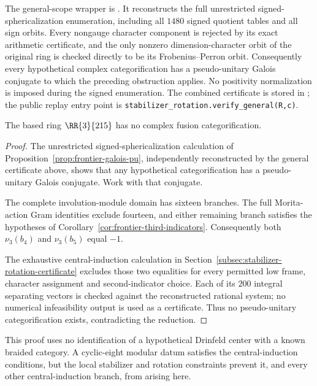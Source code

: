 The general-scope wrapper is
. It reconstructs the full
unrestricted signed-sphericalization enumeration, including all $1480$
signed quotient tables and all sign orbits.  Every nongauge character
component is rejected by its exact arithmetic certificate, and the only
nonzero dimension-character orbit of the original ring is checked directly
to be its Frobenius--Perron orbit.  Consequently every hypothetical complex
categorification has a pseudo-unitary Galois conjugate to which the preceding
obstruction applies.  No positivity normalization is imposed during the
signed enumeration.  The combined certificate is stored in
; the public replay entry
point is \texttt{stabilizer\_rotation.verify\_general(R,c)}.

\begin{theorem}
\label{thm:frontier-noncategorifiable}\label{thm:stabilizer-rotation-frontier}
The based ring $\RR{3}{215}$ has no complex fusion categorification.
\end{theorem}
\begin{proof}
The unrestricted signed-sphericalization calculation of
Proposition~\ref{prop:frontier-galois-pu}, independently reconstructed by
the general certificate above, shows that any hypothetical
categorification has a pseudo-unitary Galois conjugate. Work with that
conjugate.

The complete involution-module domain has sixteen branches. The full
Morita-action Gram identities exclude fourteen, and either remaining
branch satisfies the hypotheses of
Corollary~\ref{cor:frontier-third-indicators}. Consequently both
$\nu_3(b_4)$ and $\nu_3(b_5)$ equal $-1$.

The exhaustive central-induction calculation in
Section~\ref{subsec:stabilizer-rotation-certificate} excludes those two
equalities for every permitted low frame, character assignment and
second-indicator choice. Each of its $200$ integral separating vectors
is checked against the reconstructed rational system; no numerical
infeasibility output is used as a certificate. Thus no pseudo-unitary
categorification exists, contradicting the reduction.
\end{proof}

This proof uses no identification of a hypothetical Drinfeld center with
a known braided category. A cyclic-eight modular datum satisfies
the central-induction conditions, but the local stabilizer and rotation
constraints prevent it,
and every other central-induction branch, from arising here.

